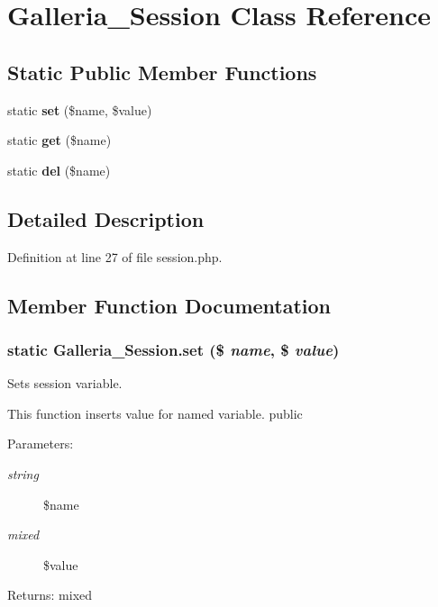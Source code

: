 \section{Galleria\_\-Session Class Reference}
\label{classGalleria__Session}
\subsection*{Static Public Member Functions}
\begin{CompactItemize}
\item 
static {\bf set} (\$name, \$value)
\item 
static {\bf get} (\$name)
\item 
static {\bf del} (\$name)
\end{CompactItemize}


\subsection{Detailed Description}


Definition at line 27 of file session.php.

\subsection{Member Function Documentation}
\subsubsection{\setlength{\rightskip}{0pt plus 5cm}static Galleria\_\-Session.set (\$ {\em name}, \$ {\em value})\hspace{0.3cm}{\tt  [static]}}\label{classGalleria__Session_88f28cbe9ada4cec5fde5c2c9aef1a94}


Sets session variable.

This function inserts value for named variable.  public

\begin{Desc}
\item[Parameters:]
\begin{description}
\item[{\em string}]\$name \item[{\em mixed}]\$value \end{description}
\end{Desc}
\begin{Desc}
\item[Returns:]mixed \end{Desc}



